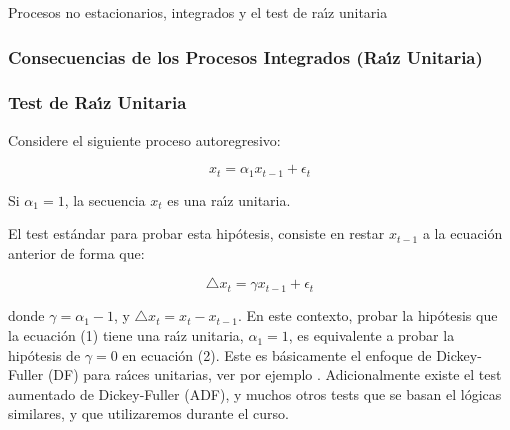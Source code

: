 \documentclass[spanish,xcolor=table]{beamer}
\begin{document}
\begin{section}{Procesos no estacionarios, integrados y el test de ra\'{\i}z unitaria}
\begin{frame}
\frametitle{Consecuencias de los Procesos Integrados (Ra\'{\i}z Unitaria)}

 
\end{frame}

\begin{frame}
\frametitle{Test de Ra\'{\i}z Unitaria}

Considere el siguiente proceso autoregresivo:

\begin{equation} \label{AR1}
x_t =\alpha_1 x_{t-1} + \epsilon_t
\end{equation}

Si $\alpha_1=1$, la secuencia $x_t$ es una ra\'{\i}z unitaria.

El test est\'andar para probar esta hip\'otesis, consiste en restar $x_{t-1}$ a la ecuaci\'on anterior de forma que:

\begin{equation}
\triangle x_t =\gamma x_{t-1} + \epsilon_t
\end{equation}

donde $\gamma=\alpha_1-1$, y $\triangle x_t = x_t - x_{t-1}$. En este contexto, probar la hip\'otesis que la ecuaci\'on (1) tiene una ra\'{\i}z unitaria, $\alpha_1 = 1$, es equivalente a probar la hip\'otesis de $\gamma=0$ en ecuaci\'on (2). 
Este es b\'asicamente el enfoque de Dickey-Fuller (DF) para ra\'{\i}ces unitarias, ver por ejemplo \cite{dickey1981likelihood}. Adicionalmente existe el test aumentado de Dickey-Fuller (ADF), y muchos otros tests que se basan el l\'ogicas similares, y que utilizaremos durante el curso.


\end{frame}
\end{section}
\end{document}
